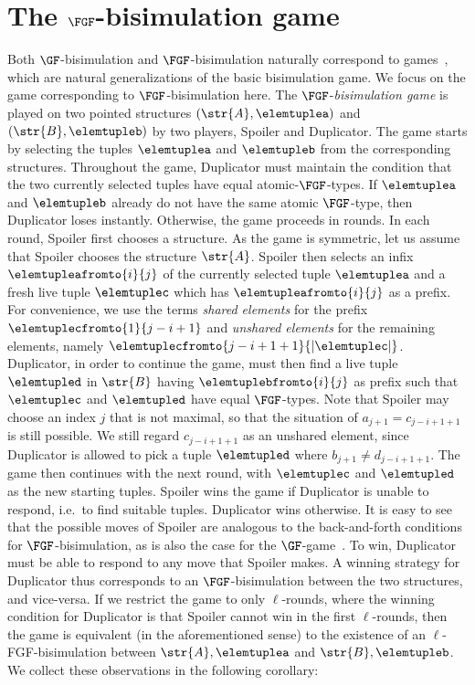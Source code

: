 \section{The $\FGF$-bisimulation game}\label{sec:fgf-game}
Both $\GF$-bisimulation and $\FGF$-bisimulation naturally correspond to games~\cite[Sec. 1.2.1]{Gradel014}, which are natural generalizations of the basic bisimulation game.
We focus on the game corresponding to $\FGF$-bisimulation here.
The $\FGF$-\emph{bisimulation game} is played on two pointed structures $(\str{A}, \elemtuplea)$ and $(\str{B}, \elemtupleb)$ by two players, Spoiler and Duplicator.
The game starts by selecting the tuples $\elemtuplea$ and $\elemtupleb$ from the corresponding structures.
Throughout the game, Duplicator must maintain the condition that the two currently selected tuples have equal atomic-$\FGF$-types.
If $\elemtuplea$ and $\elemtupleb$ already do not have the same atomic $\FGF$-type, then Duplicator loses instantly.
Otherwise, the game proceeds in rounds.
In each round, Spoiler first chooses a structure.
As the game is symmetric, let us assume that Spoiler chooses the structure $\str{A}$.
Spoiler then selects an infix $\elemtupleafromto{i}{j}$ of the currently selected tuple $\elemtuplea$ and a fresh live tuple $\elemtuplec$ which has $\elemtupleafromto{i}{j}$ as a prefix.
For convenience, we use the terms \emph{shared elements} for the prefix $\elemtuplecfromto{1}{j-i+1}$ and \emph{unshared elements} for the remaining elements, namely $\elemtuplecfromto{j-i+1+1}{|\elemtuplec|}$.
Duplicator, in order to continue the game, must then find a live tuple $\elemtupled$ in $\str{B}$ having $\elemtuplebfromto{i}{j}$ as prefix such that $\elemtuplec$ and $\elemtupled$ have equal $\FGF$-types.
Note that Spoiler may choose an index $j$ that is not maximal, so that the situation of $a_{j+1} = c_{j-i+1+1}$ is still possible.
We still regard $c_{j-i+1+1}$ as an unshared element, since Duplicator is allowed to pick a tuple $\elemtupled$ where $b_{j+1} \neq d_{j-i+1+1}$.
The game then continues with the next round, with $\elemtuplec$ and $\elemtupled$ as the new starting tuples.
Spoiler wins the game if Duplicator is unable to respond, i.e.\ to find suitable tuples.
Duplicator wins otherwise.
It is easy to see that the possible moves of Spoiler are analogous to the back-and-forth conditions for $\FGF$-bisimulation, as is also the case for the $\GF$-game~\cite[Sec.\ 1.3.2]{Gradel014}.
To win, Duplicator must be able to respond to any move that Spoiler makes.
A winning strategy for Duplicator thus corresponds to an $\FGF$-bisimulation between the two structures, and vice-versa.
If we restrict the game to only $\ell$-rounds, where the winning condition for Duplicator is that Spoiler cannot win in the first $\ell$-rounds, then the game is equivalent (in the aforementioned sense) to the existence of an $\ell$-FGF-bisimulation between $\str{A}, \elemtuplea$ and $\str{B}, \elemtupleb$.
We collect these observations in the following corollary:

